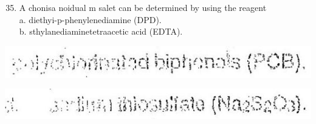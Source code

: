 \documentclass[10pt]{article}
\begin{document}
\begin{enumerate}
  \setcounter{enumi}{34}
  \item A chonisa noidual m salet can be determined by using the reagent\\
a. diethyi-p-phenylenediamine (DPD).\\
b. sthylanediaminetetraacetic acid (EDTA).
\end{enumerate}

\includegraphics[max width=\textwidth]{2022_11_11_ca6a6c1a0324ee23e523g-22(1)}

\includegraphics[max width=\textwidth]{2022_11_11_ca6a6c1a0324ee23e523g-22(2)}
\end{document}
